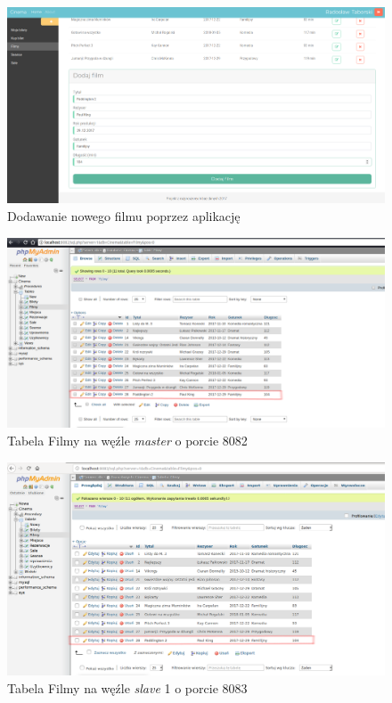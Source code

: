 \begin{figure} [H]
	\centering
	\includegraphics[width=1\linewidth]{rozdzial06/5.png}
	\caption{Dodawanie nowego filmu poprzez aplikację}
	\label{fig:addFilm}
\end{figure}

\begin{figure} [H]
	\centering
	\includegraphics[width=1\linewidth]{rozdzial06/7.png}
	\caption{Tabela Filmy na węźle \textit{master} o porcie 8082}
	\label{fig:FilmMaster}
\end{figure}

\begin{figure} [H]
	\centering
	\includegraphics[width=1\linewidth]{rozdzial06/8.png}
	\caption{Tabela Filmy na węźle \textit{slave} 1 o porcie 8083}
	\label{fig:FilmSlave}
\end{figure}

